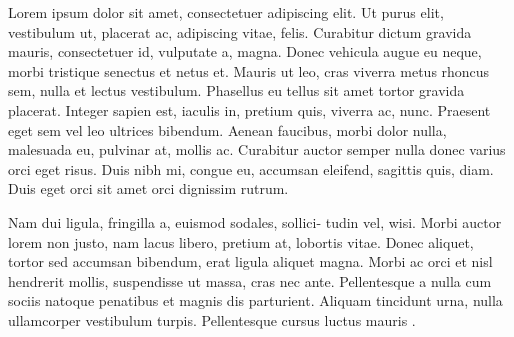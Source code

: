 \documentclass[twocolumn]{aastex631}
\begin{document}
Lorem ipsum dolor sit amet, consectetuer adipiscing elit.
Ut purus elit, vestibulum ut, placerat ac, adipiscing vitae, felis.
Curabitur dictum gravida mauris, consectetuer id, vulputate a, magna.
Donec vehicula augue eu neque, morbi tristique senectus et netus et.
Mauris ut leo, cras viverra metus rhoncus sem, nulla et lectus vestibulum.
Phasellus eu tellus sit amet tortor gravida placerat.
Integer sapien est, iaculis in, pretium quis, viverra ac, nunc.
Praesent eget sem vel leo ultrices bibendum.
Aenean faucibus, morbi dolor nulla, malesuada eu, pulvinar at, mollis ac.
Curabitur auctor semper nulla donec varius orci eget risus.
Duis nibh mi, congue eu, accumsan eleifend, sagittis quis, diam.
Duis eget orci sit amet orci dignissim rutrum.

Nam dui ligula, fringilla a, euismod sodales, sollici- tudin vel, wisi.
Morbi auctor lorem non justo, nam lacus libero, pretium at, lobortis vitae.
Donec aliquet, tortor sed accumsan bibendum, erat ligula aliquet magna.
Morbi ac orci et nisl hendrerit mollis, suspendisse ut massa, cras nec ante.
Pellentesque a nulla cum sociis natoque penatibus et magnis dis parturient.
Aliquam tincidunt urna, nulla ullamcorper vestibulum turpis.
Pellentesque cursus luctus mauris \citep{Luger2021}.


\end{document}
